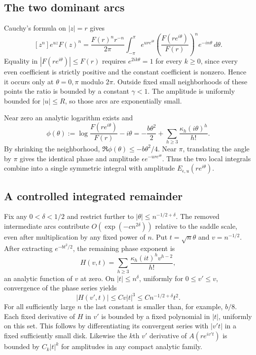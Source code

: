 \documentclass[11pt,letterpaper]{article}
\theoremstyle{remark}\newtheorem{remark}[theorem]{Remark}
\begin{document}
\subsection{The two dominant arcs}
Cauchy's formula on $|z|=r$ gives
\begin{equation}\label{lcw:eq:cauchy}
 [z^n]e^{uz}F(z)^n
 =\frac{F(r)^nr^{-n}}{2\pi}
 \int_{-\pi}^{\pi}e^{ur e^{i\theta}}
 \left(\frac{F(re^{i\theta})}{F(r)}\right)^n e^{-in\theta}\,d\theta.
\end{equation}
Equality in $|F(re^{i\theta})|\le F(r)$ requires $e^{2ik\theta}=1$ for every $k\ge0$, since every even coefficient is strictly positive and the constant coefficient is nonzero. Hence it occurs only at $\theta=0,\pi$ modulo $2\pi$. Outside fixed small neighborhoods of these points the ratio is bounded by a constant $\gamma<1$. The amplitude is uniformly bounded for $|u|\le R$, so those arcs are exponentially small.

Near zero an analytic logarithm exists and
\begin{equation}\label{lcw:eq:phase}
 \phi(\theta):=\log\frac{F(re^{i\theta})}{F(r)}-i\theta
 =-\frac{b\theta^2}{2}+\sum_{h\ge3}\frac{\kappa_h(i\theta)^h}{h!}.
\end{equation}
By shrinking the neighborhood, $\Re\phi(\theta)\le-b\theta^2/4$. Near $\pi$, translating the angle by $\pi$ gives the identical phase and amplitude
$\epsilon e^{-ur e^{i\theta}}$. Thus the two local integrals combine into a single symmetric integral with amplitude $E_{\epsilon,u}(re^{i\theta})$.

\subsection{A controlled integrated remainder}\label{lcw:sec:remainder}
Fix any $0<\delta<1/2$ and restrict further to $|\theta|\le n^{-1/2+\delta}$. The removed intermediate arcs contribute $O(\exp(-c n^{2\delta}))$ relative to the saddle scale, even after multiplication by any fixed power of $n$. Put $t=\sqrt n\theta$ and $v=n^{-1/2}$. After extracting $e^{-bt^2/2}$, the remaining phase exponent is
\begin{equation}\label{lcw:eq:H}
 H(v,t)=\sum_{h\ge3}\frac{\kappa_h(it)^h v^{h-2}}{h!},
\end{equation}
an analytic function of $v$ at zero. On $|t|\le n^\delta$, uniformly for $0\le v'\le v$, convergence of the phase series yields
\[
 |H(v',t)|\le C v|t|^3\le C n^{-1/2+\delta}t^2.
\]
For all sufficiently large $n$ the last constant is smaller than, for example, $b/8$. Each fixed derivative of $H$ in $v'$ is bounded by a fixed polynomial in $|t|$, uniformly on this set. This follows by differentiating its convergent series with $|v't|$ in a fixed sufficiently small disk. Likewise the $k$th $v'$ derivative of $A(re^{iv't})$ is bounded by $C_k|t|^k$ for amplitudes in any compact analytic family.
\end{document}
